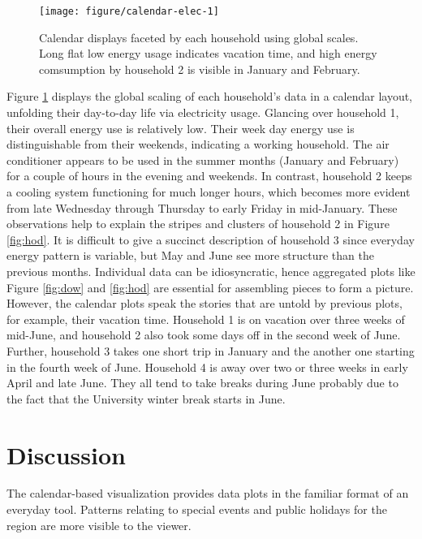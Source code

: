 \documentclass[12pt]{article}
\begin{document}
\begin{figure}

{\centering \texttt{[image: figure/calendar-elec-1]} 

}

\caption{Calendar displays faceted by each household using global scales. Long flat low energy usage indicates vacation time, and high energy comsumption by household 2 is visible in January and February.}\label{fig:calendar-elec}
\end{figure}

Figure \ref{fig:calendar-elec} displays the global scaling of each household's data in a calendar layout, unfolding their day-to-day life via electricity usage. Glancing over household 1, their overall energy use is relatively low. Their week day energy use is distinguishable from their weekends, indicating a working household. The air conditioner appears to be used in the summer months (January and February) for a couple of hours in the evening and weekends. In contrast, household 2 keeps a cooling system functioning for much longer hours, which becomes more evident from late Wednesday through Thursday to early Friday in mid-January. These observations help to explain the stripes and clusters of household 2 in Figure \ref{fig:hod}. It is difficult to give a succinct description of household 3 since everyday energy pattern is variable, but May and June see more structure than the previous months. Individual data can be idiosyncratic, hence aggregated plots like Figure \ref{fig:dow} and \ref{fig:hod} are essential for assembling pieces to form a picture. However, the calendar plots speak the stories that are untold by previous plots, for example, their vacation time. Household 1 is on vacation over three weeks of mid-June, and household 2 also took some days off in the second week of June. Further, household 3 takes one short trip in January and the another one starting in the fourth week of June. Household 4 is away over two or three weeks in early April and late June. They all tend to take breaks during June probably due to the fact that the University winter break starts in June.

\hypertarget{sec:discussion}{%
\section{Discussion}\label{sec:discussion}}

The calendar-based visualization provides data plots in the familiar format of an everyday tool. Patterns relating to special events and public holidays for the region are more visible to the viewer.
\end{document}
